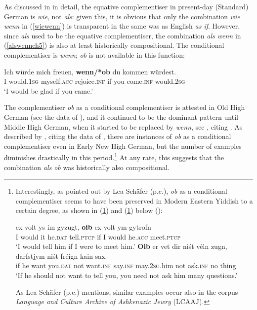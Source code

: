 As discussed in  in detail, the equative complementiser in present-day (Standard) German is \textit{wie}, not \textit{als}: given this, it is obvious that only the combination \textit{wie wenn} in (\ref{wiewenn}) is transparent in the same was as English \textit{as if}. However, since \textit{als} used to be the equative complementiser, the combination \textit{als wenn}  in (\ref{alswennch5}) is also at least historically compositional. The conditional complementiser is \textit{wenn}; \textit{ob} is not available in this function:

\ea \gll Ich würde mich freuen, \textbf{wenn/*ob} du kommen würdest.\\
I would.\textsc{1sg} myself.\textsc{acc} rejoice.\textsc{inf} if you come.\textsc{inf} would.\textsc{2sg}\\
\glt `I would be glad if you came.'
\z\largerpage

The complementiser \textit{ob} as a conditional complementiser is attested in Old High German (see the data of \citealt[157--158]{schrodt2004}), and it continued to be the dominant pattern until Middle High German, when it started to be replaced by \textit{wenn}, see \citet[388]{rudolph1996}, citing \citet{paul1920band3}. As described by \citet[109]{ferrell1968}, citing the data of \citet[347--348]{behaghel1928}, there are instances of \textit{ob} as a conditional complementiser even in Early New High German, but the number of examples diminishes drastically in this period.\footnote{Interestingly, as pointed out by Lea Schäfer (p.c.), \textit{ob} as a conditional complementiser seems to have been preserved in Modern Eastern Yiddish to a certain degree, as shown in (\ref{oib1}) and (\ref{oib2}) below (\citealt[305]{birnbaum1979}):

\ea \gll ex volt ys im gyzugt, \textbf{oib} ex volt ym gytrofn\\
I would it he.\textsc{dat} tell.\textsc{ptcp} if I would he.\textsc{acc} meet.\textsc{ptcp} \label{oib1}\\
\glt `I would tell him if I were to meet him.'
\ex \gll \textbf{Oib} er vet dir ni\'st v\'eln zugn, darfstjym ni\'st fr\'eign kain sax. \label{oib2}\\
if he want you.\textsc{dat} not want.\textsc{inf} say.\textsc{inf} may.\textsc{2sg}.him not ask.\textsc{inf} no thing\\
\glt `If he should not want to tell you, you need not ask him many questions.'
\z

As Lea Schäfer (p.c.) mentions, similar examples occur also in the corpus \textit{Language and Culture Archive of Ashkenazic Jewry} (LCAAJ).} At any rate, this suggests that the combination \textit{als ob} was historically also compositional.

